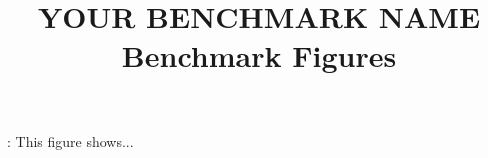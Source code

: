 \documentclass{bench}
\begin{document}
\title{YOUR BENCHMARK NAME Benchmark Figures}
\maketitle

:
This figure shows...
\end{document}
